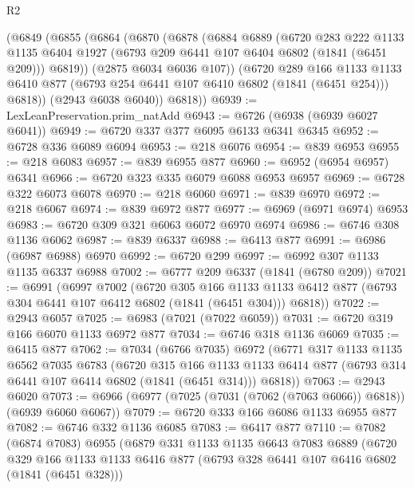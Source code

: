 \begin{lexlean}{R2}
\begin{coremodule}
    (@6849
      (@6855
        (@6864
          (@6870
            (@6878
              (@6884
                @6889
                (@6720
                  @283
                  @222
                  @1133
                  @1135
                  @6404
                  @1927
                  (@6793 @209 @6441 @107 @6404 @6802 (@1841 (@6451 @209)))
                  @6819))
              (@2875 @6034 @6036 @107))
            (@6720
              @289
              @166
              @1133
              @1133
              @6410
              @877
              (@6793 @254 @6441 @107 @6410 @6802 (@1841 (@6451 @254)))
              @6818))
          (@2943 @6038 @6040))
        @6818))
@6939 := LexLeanPreservation.prim_natAdd
@6943 := @6726 (@6938 (@6939 @6027 @6041))
@6949 := @6720 @337 @377 @6095 @6133 @6341 @6345
@6952 := @6728 @336 @6089 @6094
@6953 := @218 @6076
@6954 := @839 @6953
@6955 := @218 @6083
@6957 := @839 @6955 @877
@6960 := @6952 (@6954 @6957) @6341
@6966 := @6720 @323 @335 @6079 @6088 @6953 @6957
@6969 := @6728 @322 @6073 @6078
@6970 := @218 @6060
@6971 := @839 @6970
@6972 := @218 @6067
@6974 := @839 @6972 @877
@6977 := @6969 (@6971 @6974) @6953
@6983 := @6720 @309 @321 @6063 @6072 @6970 @6974
@6986 := @6746 @308 @1136 @6062
@6987 := @839 @6337
@6988 := @6413 @877
@6991 := @6986 (@6987 @6988) @6970
@6992 := @6720 @299
@6997 := @6992 @307 @1133 @1135 @6337 @6988
@7002 := @6777 @209 @6337 (@1841 (@6780 @209))
@7021 := @6991
    (@6997
      @7002
      (@6720
        @305
        @166
        @1133
        @1133
        @6412
        @877
        (@6793 @304 @6441 @107 @6412 @6802 (@1841 (@6451 @304)))
        @6818))
@7022 := @2943 @6057
@7025 := @6983 (@7021 (@7022 @6059))
@7031 := @6720 @319 @166 @6070 @1133 @6972 @877
@7034 := @6746 @318 @1136 @6069
@7035 := @6415 @877
@7062 := @7034
    (@6766 @7035)
    @6972
    (@6771
      @317
      @1133
      @1135
      @6562
      @7035
      @6783
      (@6720
        @315
        @166
        @1133
        @1133
        @6414
        @877
        (@6793 @314 @6441 @107 @6414 @6802 (@1841 (@6451 @314)))
        @6818))
@7063 := @2943 @6020
@7073 := @6966 (@6977 (@7025 (@7031 (@7062 (@7063 @6066)) @6818)) (@6939 @6060 @6067))
@7079 := @6720 @333 @166 @6086 @1133 @6955 @877
@7082 := @6746 @332 @1136 @6085
@7083 := @6417 @877
@7110 := @7082
    (@6874 @7083)
    @6955
    (@6879
      @331
      @1133
      @1135
      @6643
      @7083
      @6889
      (@6720
        @329
        @166
        @1133
        @1133
        @6416
        @877
        (@6793 @328 @6441 @107 @6416 @6802 (@1841 (@6451 @328)))

\end{coremodule}
\end{lexlean}
